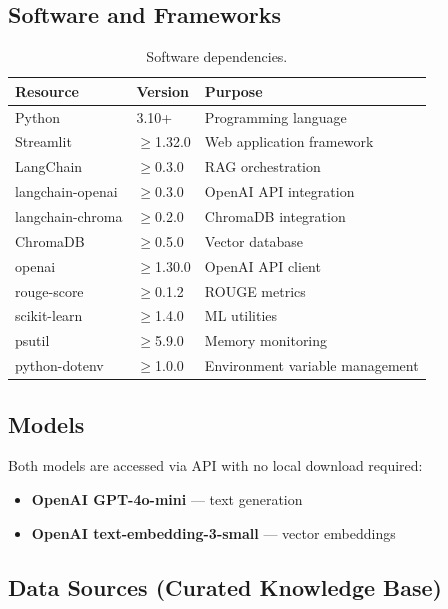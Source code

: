 \documentclass[12pt, a4paper]{article}
\begin{document}
\subsection{Software and Frameworks}

\begin{table}[h]
\centering
\begin{tabular}{@{}lll@{}}
\toprule
\textbf{Resource} & \textbf{Version} & \textbf{Purpose} \\
\midrule
Python & 3.10+ & Programming language \\
Streamlit & $\geq$1.32.0 & Web application framework \\
LangChain & $\geq$0.3.0 & RAG orchestration \\
langchain-openai & $\geq$0.3.0 & OpenAI API integration \\
langchain-chroma & $\geq$0.2.0 & ChromaDB integration \\
ChromaDB & $\geq$0.5.0 & Vector database \\
openai & $\geq$1.30.0 & OpenAI API client \\
rouge-score & $\geq$0.1.2 & ROUGE metrics \\
scikit-learn & $\geq$1.4.0 & ML utilities \\
psutil & $\geq$5.9.0 & Memory monitoring \\
python-dotenv & $\geq$1.0.0 & Environment variable management \\
\bottomrule
\end{tabular}
\caption{Software dependencies.}
\end{table}

\subsection{Models}

Both models are accessed via API with no local download required:
\begin{itemize}[nosep]
    \item \textbf{OpenAI GPT-4o-mini} --- text generation
    \item \textbf{OpenAI text-embedding-3-small} --- vector embeddings
\end{itemize}

\subsection{Data Sources (Curated Knowledge Base)}
\end{document}
